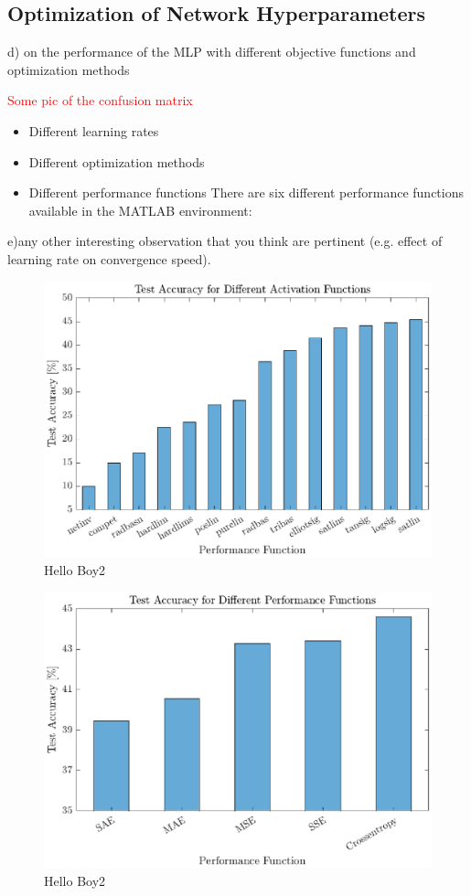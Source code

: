 \FloatBarrier
\subsection{Optimization of Network Hyperparameters}\label{subsec:optNet}
d) on the performance of the MLP with different objective functions and optimization methods

\textcolor{red}{Some pic of the confusion matrix}

\begin{itemize}
   	\item Different learning rates
	    	
   	\item Different optimization methods
   	
   	\item Different performance functions
   	There are six different performance functions available in the MATLAB environment:
   	
   
\end{itemize}
e)any other interesting observation that you think are pertinent (e.g. effect of learning rate on convergence speed).
	  	\begin{figure}[h!]
	  		\centering	  		
	  		\includegraphics{images/activationFct}
	  		\caption{Hello Boy2}
	  		\label{fig:test2}
	  	\end{figure}
	  	
	  	\begin{figure}[h!]
	  		\centering	  		
	  		\includegraphics{images/performFct}
	  		\caption{Hello Boy2}
	  		\label{fig:test2}
	  	\end{figure}	  	


